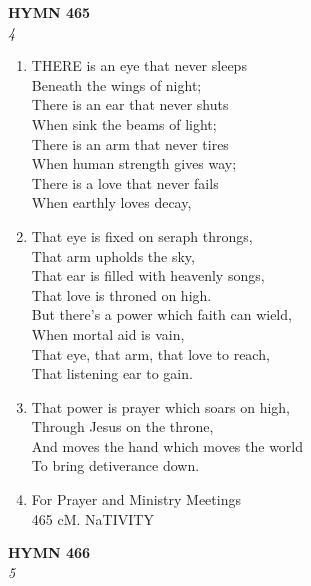 \documentclass[11pt,a4paper]{article}
\begin{document}
\newpage
\begin{center}
    {\Large \textbf{HYMN 465}}
    \\
    \textit{4}
\end{center}
\vspace{1em}

\begin{enumerate}
    \item THERE is an eye that never sleeps \\
        Beneath the wings of night; \\
        There is an ear that never shuts \\
        When sink the beams of light; \\
        There is an arm that never tires \\
        When human strength gives way; \\
        There is a love that never fails \\
        When earthly loves decay,

    \item That eye is fixed on seraph throngs, \\
        That arm upholds the sky, \\
        That ear is filled with heavenly songs, \\
        That love is throned on high. \\
        But there's a power which faith can wield, \\
        When mortal aid is vain, \\
        That eye, that arm, that love to reach, \\
        That listening ear to gain.

    \item That power is prayer which soars on high, \\
        Through Jesus on the throne, \\
        And moves the hand which moves the world \\
        To bring detiverance down.

    \item For Prayer and Ministry Meetings \\
        465 cM. NaTIVITY

\end{enumerate}

\newpage
\begin{center}
    {\Large \textbf{HYMN 466}}
    \\
    \textit{5}
\end{center}
\vspace{1em}
\end{document}
